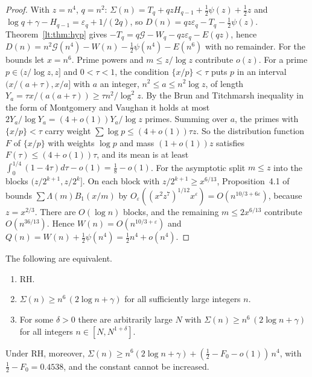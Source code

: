 \begin{proof}
With $z=n^4$, $q=n^2$: $\Sigma(n)=T_q+qzH_{q-1}+\tfrac12\psi(z)+\tfrac12z$ and $\log q+\gamma-H_{q-1}=\varepsilon_q+1/(2q)$, so $D(n)=qz\varepsilon_q-T_q-\tfrac12\psi(z)$. Theorem~\ref{lt:thm:hyp} gives $-T_q=q\mathcal G-W_q-qz\varepsilon_q-E(qz)$, hence $D(n)=n^2\mathcal G(n^4)-W(n)-\tfrac12\psi(n^4)-E(n^6)$ with no remainder. For the bounds let $x=n^6$. Prime powers and $m\le z/\log z$ contribute $o(z)$. For a prime $p\in(z/\log z,z]$ and $0<\tau<1$, the condition $\{x/p\}<\tau$ puts $p$ in an interval $(x/(a+\tau),x/a]$ with $a$ an integer, $n^2\le a\le n^2\log z$, of length $Y_a=\tau x/(a(a+\tau))\ge\tau n^2/\log^2z$. By the Brun and Titchmarsh inequality in the form of Montgomery and Vaughan \cite{MV73} it holds at most $2Y_a/\log Y_a=(4+o(1))Y_a/\log z$ primes. Summing over $a$, the primes with $\{x/p\}<\tau$ carry weight $\sum\log p\le(4+o(1))\tau z$. So the distribution function $F$ of $\{x/p\}$ with weights $\log p$ and mass $(1+o(1))z$ satisfies $F(\tau)\le(4+o(1))\tau$, and its mean is at least $\int_0^{1/4}(1-4\tau)d\tau-o(1)=\tfrac18-o(1)$. For the asymptotic split $m\le z$ into the blocks $(z/2^{k+1},z/2^k]$. On each block with $z/2^{k+1}\ge x^{6/13}$, Proposition~4.1 of \cite{LWY21} bounds $\sum\Lambda(m)B_1(x/m)$ by $O_\varepsilon((x^2z^7)^{1/12}x^\varepsilon)=O(n^{10/3+6\varepsilon})$, because $z=x^{2/3}$. There are $O(\log n)$ blocks, and the remaining $m\le2x^{6/13}$ contribute $O(n^{36/13})$. Hence $W(n)=O(n^{10/3+\varepsilon})$ and $Q(n)=W(n)+\tfrac12\psi(n^4)=\tfrac12n^4+o(n^4)$.
\end{proof}


\begin{theorem}\label{lt:thm:clean}
The following are equivalent.
\begin{enumerate}
\item RH.
\item $\Sigma(n)\ge n^6\,(2\log n+\gamma)$ for all sufficiently large integers $n$.
\item For some $\delta>0$ there are arbitrarily large $N$ with $\Sigma(n)\ge n^6\,(2\log n+\gamma)$ for all integers $n\in[N,N^{1+\delta}]$.
\end{enumerate}
Under RH, moreover, $\Sigma(n)\ge n^6(2\log n+\gamma)+(\tfrac12-F_0-o(1))\,n^4$, with $\tfrac12-F_0=0.4538$, and the constant cannot be increased.
\end{theorem}

